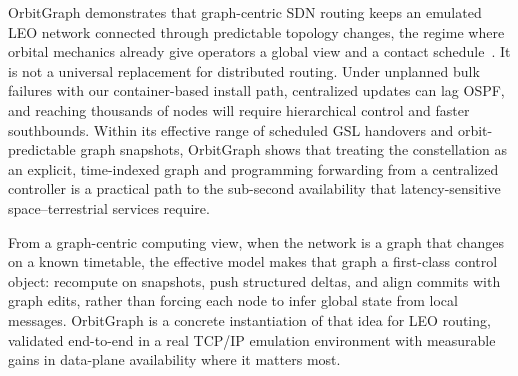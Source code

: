 OrbitGraph demonstrates that graph-centric SDN routing keeps an emulated LEO
network connected through predictable topology changes, the regime where orbital
mechanics already give operators a global view and a contact
schedule~\cite{kassing2020exploring,handley:ground-relays:2019}.
It is not a universal replacement for distributed routing. Under unplanned bulk
failures with our container-based install path, centralized updates can lag
OSPF, and reaching thousands of nodes will require hierarchical control and
faster southbounds.
Within its effective range of scheduled GSL handovers and orbit-predictable
graph snapshots, OrbitGraph shows that treating the constellation as an
explicit, time-indexed graph and programming forwarding from a centralized
controller is a practical path to the sub-second availability that
latency-sensitive space--terrestrial services require.

From a graph-centric computing view, when the network is a graph that changes
on a known timetable, the effective model makes that graph a first-class control
object: recompute on snapshots, push structured deltas, and align commits with
graph edits, rather than forcing each node to infer global state from local
messages.
OrbitGraph is a concrete instantiation of that idea for LEO routing, validated
end-to-end in a real TCP/IP emulation environment with measurable gains in
data-plane availability where it matters most.

